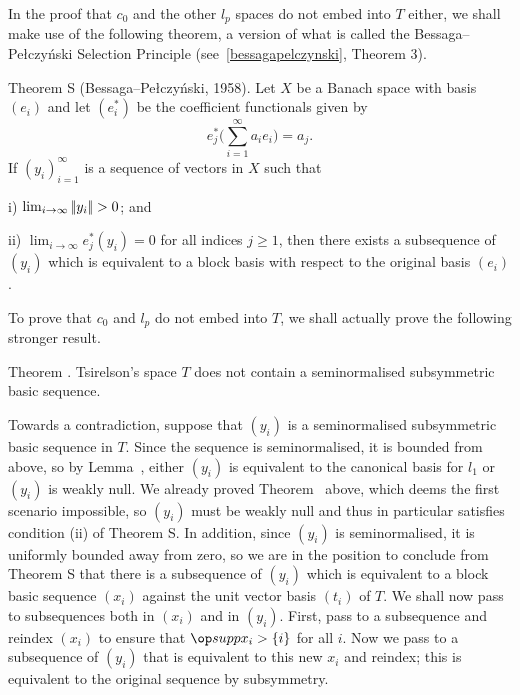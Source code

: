 In the proof that $c_0$ and the other $l_p$ spaces do not embed into $T$ either, we shall make use of
the following theorem, a version of what is called the Bessaga--Pe\l czy\'nski Selection Principle
(see~\ref{bessagapelczynski}, Theorem 3).

\parenproclaim Theorem S (Bessaga--Pe\l czy\'nski, {\rm 1958}).
Let $X$ be a Banach space with basis $(e_i)$ and let $(e_i^*)$ be the coefficient
functionals given by
$$ e_j^*\Big(\sum_{i=1}^\infty a_i e_i\Bigr) = a_j.$$
If $(y_i)_{i=1}^\infty$ is a sequence of vectors in $X$ such that
\medskip
\item{i)} $\lim_{i\to\infty} |\!|y_i|\!| > 0$; and
\smallskip
\item{ii)} $\lim_{i\to\infty} e_j^*(y_i) = 0$ for all indices $j\ge 1$,
\medskip\noindent
then there exists a subsequence of $(y_i)$ which is equivalent to a block basis with respect to the original
basis $(e_i)$.\slug

To prove that $c_0$ and $l_p$ do not embed into $T$, we shall actually prove the following stronger result.

\proclaim Theorem \advthm. Tsirelson's space $T$ does not contain a seminormalised subsymmetric basic
sequence.

\proof Towards a contradiction, suppose that $(y_i)$ is a seminormalised subsymmetric basic sequence in $T$.
Since the sequence is seminormalised, it is bounded from above, so by Lemma~{\the\dichotomy}, either $(y_i)$
is equivalent to the canonical basis for $l_1$ or $(y_i)$ is weakly null. We already proved Theorem~{\the\nolone}
above, which deems the first scenario impossible, so $(y_i)$ must be weakly null and thus in particular
satisfies condition (ii) of Theorem S. In addition, since $(y_i)$ is seminormalised, it is uniformly bounded
away from zero, so we are in the position to conclude from Theorem S that there is a subsequence of $(y_i)$
which is equivalent to a block basic sequence $(x_i)$ against the unit vector basis $(t_i)$ of $T$.
We shall now pass to subsequences both in $(x_i)$
and in $(y_i)$. First, pass to a subsequence and reindex $(x_i)$ to ensure that $\supp x_i > \{i\}$ for all $i$.
Now we pass to a subsequence of $(y_i)$ that is equivalent to this new $x_i$ and reindex; this is equivalent
to the original sequence by subsymmetry.

